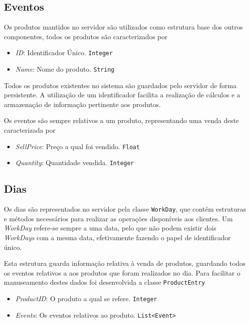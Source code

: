 \documentclass[runningheads]{llncs}
\begin{document}
\subsection{Eventos}
Os produtos mantidos no servidor são utilizados como estrutura base dos outros componentes, todos os produtos são caracterizados por

\begin{itemize}
  \item \emph{ID}: Identificador Único. \texttt{Integer}
  \item \emph{Name}: Nome do produto. \texttt{String}
\end{itemize}

Todos os produtos existentes no sistema são guardados pelo servidor de forma persistente. A utilização de um identificador facilita a realização de cálculos e a armazenação de informação pertinente aos produtos.

\noindent Os eventos são sempre relativos a um produto, representando uma venda deste caracterizada por

\begin{itemize}
  \item \emph{SellPrice}: Preço a qual foi vendido. \texttt{Float}
  \item \emph{Quantity}: Quantidade vendida. \texttt{Integer}
\end{itemize}


\subsection{Dias}
Os dias são representados no servidor pela classe \texttt{WorkDay}, que contém estruturas e métodos necessários para realizar as operações disponíveis aos clientes.
Um \emph{WorkDay} refere-se sempre a uma data, pelo que não podem existir dois \emph{WorkDays} com a mesma data, efetivamente fazendo o papel de identificador único.

\noindent Esta estrutura guarda informação relativa à venda de produtos, guardando todos os eventos relativos a aos produtos que foram realizados no dia.
Para facilitar o manuseamento destes dados foi desenvolvida a classe \texttt{ProductEntry}

\begin{itemize}
  \item \emph{ProductID}: O produto a qual se refere. \texttt{Integer}
  \item \emph{Events}: Os eventos relativos ao produto. \texttt{List<Event>}
\end{itemize}
\end{document}
